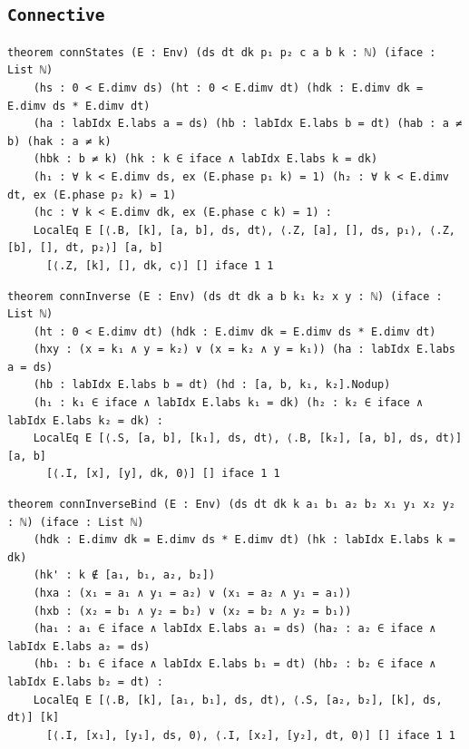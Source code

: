 \subsection{\texttt{Connective}}
\begin{lstlisting}[style=leancore]
theorem connStates (E : Env) (ds dt dk p₁ p₂ c a b k : ℕ) (iface : List ℕ)
    (hs : 0 < E.dimv ds) (ht : 0 < E.dimv dt) (hdk : E.dimv dk = E.dimv ds * E.dimv dt)
    (ha : labIdx E.labs a = ds) (hb : labIdx E.labs b = dt) (hab : a ≠ b) (hak : a ≠ k)
    (hbk : b ≠ k) (hk : k ∈ iface ∧ labIdx E.labs k = dk)
    (h₁ : ∀ k < E.dimv ds, ex (E.phase p₁ k) = 1) (h₂ : ∀ k < E.dimv dt, ex (E.phase p₂ k) = 1)
    (hc : ∀ k < E.dimv dk, ex (E.phase c k) = 1) :
    LocalEq E [⟨.B, [k], [a, b], ds, dt⟩, ⟨.Z, [a], [], ds, p₁⟩, ⟨.Z, [b], [], dt, p₂⟩] [a, b]
      [⟨.Z, [k], [], dk, c⟩] [] iface 1 1
\end{lstlisting}
\begin{lstlisting}[style=leancore]
theorem connInverse (E : Env) (ds dt dk a b k₁ k₂ x y : ℕ) (iface : List ℕ)
    (ht : 0 < E.dimv dt) (hdk : E.dimv dk = E.dimv ds * E.dimv dt)
    (hxy : (x = k₁ ∧ y = k₂) ∨ (x = k₂ ∧ y = k₁)) (ha : labIdx E.labs a = ds)
    (hb : labIdx E.labs b = dt) (hd : [a, b, k₁, k₂].Nodup)
    (h₁ : k₁ ∈ iface ∧ labIdx E.labs k₁ = dk) (h₂ : k₂ ∈ iface ∧ labIdx E.labs k₂ = dk) :
    LocalEq E [⟨.S, [a, b], [k₁], ds, dt⟩, ⟨.B, [k₂], [a, b], ds, dt⟩] [a, b]
      [⟨.I, [x], [y], dk, 0⟩] [] iface 1 1
\end{lstlisting}
\begin{lstlisting}[style=leancore]
theorem connInverseBind (E : Env) (ds dt dk k a₁ b₁ a₂ b₂ x₁ y₁ x₂ y₂ : ℕ) (iface : List ℕ)
    (hdk : E.dimv dk = E.dimv ds * E.dimv dt) (hk : labIdx E.labs k = dk)
    (hk' : k ∉ [a₁, b₁, a₂, b₂])
    (hxa : (x₁ = a₁ ∧ y₁ = a₂) ∨ (x₁ = a₂ ∧ y₁ = a₁))
    (hxb : (x₂ = b₁ ∧ y₂ = b₂) ∨ (x₂ = b₂ ∧ y₂ = b₁))
    (ha₁ : a₁ ∈ iface ∧ labIdx E.labs a₁ = ds) (ha₂ : a₂ ∈ iface ∧ labIdx E.labs a₂ = ds)
    (hb₁ : b₁ ∈ iface ∧ labIdx E.labs b₁ = dt) (hb₂ : b₂ ∈ iface ∧ labIdx E.labs b₂ = dt) :
    LocalEq E [⟨.B, [k], [a₁, b₁], ds, dt⟩, ⟨.S, [a₂, b₂], [k], ds, dt⟩] [k]
      [⟨.I, [x₁], [y₁], ds, 0⟩, ⟨.I, [x₂], [y₂], dt, 0⟩] [] iface 1 1
\end{lstlisting}

